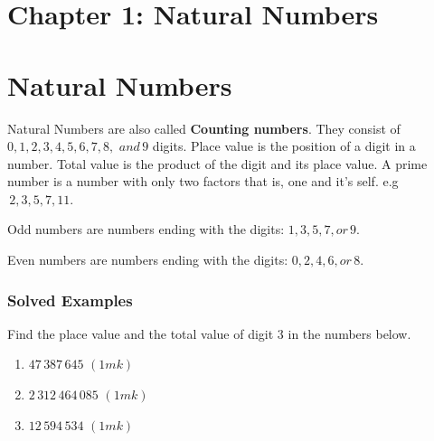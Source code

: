 \documentclass[
  a4paperpaper,
]{scrbook}
\begin{document}

\chapter{Chapter 1: Natural Numbers}\label{chapter-1-natural-numbers}


\chapter*{Natural Numbers}\label{natural-numbers}


Natural Numbers are also called \textbf{Counting numbers}. They consist
of \(0, 1, 2, 3, 4, 5, 6, 7, 8,\) \(and\, 9\) digits. Place value is the
position of a digit in a number. Total value is the product of the digit
and its place value. A prime number is a number with only two factors
that is, one and it's self. e.g \(\,2, 3, 5, 7, 11.\)

Odd numbers are numbers ending with the digits: \(1, 3, 5, 7, or \,9.\)

Even numbers are numbers ending with the digits: \(0, 2, 4, 6, or\, 8.\)

\subsection{Solved Examples}\label{solved-examples}

\begin{tcolorbox}[enhanced jigsaw, left=2mm, colframe=quarto-callout-note-color-frame, toptitle=1mm, opacitybacktitle=0.6, rightrule=.15mm, colbacktitle=quarto-callout-note-color!10!white, colback=white, arc=.35mm, breakable, leftrule=.75mm, bottomtitle=1mm, bottomrule=.15mm, title=\textcolor{quarto-callout-note-color}{\faInfo}\hspace{0.5em}{Example 1}, titlerule=0mm, coltitle=black, toprule=.15mm, opacityback=0]

Find the place value and the total value of digit 3 in the numbers
below.

\begin{enumerate}
\def\labelenumi{\alph{enumi})}
\item
  \(47\, 387 \,645\) \((1mk)\)
\item
  \(2\, 312 \,464\,085\) \((1mk)\)
\item
  \(12\, 594 \,534\) \((1mk)\)
\end{enumerate}

\end{tcolorbox}
\end{document}
